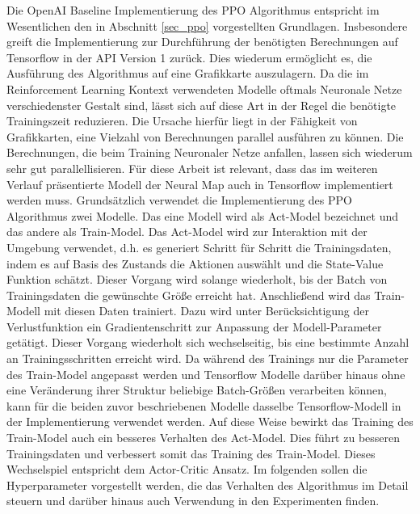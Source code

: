 Die OpenAI Baseline Implementierung des PPO Algorithmus entspricht im Wesentlichen den in Abschnitt \ref{sec_ppo} vorgestellten Grundlagen. Insbesondere greift die Implementierung zur Durchführung der benötigten Berechnungen auf Tensorflow in der API Version 1 zurück. Dies wiederum ermöglicht es, die Ausführung des Algorithmus auf eine Grafikkarte auszulagern. Da die im Reinforcement Learning Kontext verwendeten Modelle oftmals Neuronale Netze verschiedenster Gestalt sind, lässt sich auf diese Art in der Regel die benötigte Trainingszeit reduzieren. Die Ursache hierfür liegt in der Fähigkeit von Grafikkarten, eine Vielzahl von Berechnungen parallel ausführen zu können. Die Berechnungen, die beim Training Neuronaler Netze anfallen, lassen sich wiederum sehr gut parallellisieren. Für diese Arbeit ist relevant, dass das im weiteren Verlauf präsentierte Modell der Neural Map auch in Tensorflow implementiert werden muss. Grundsätzlich verwendet die Implementierung des PPO Algorithmus zwei Modelle. Das eine Modell wird als Act-Model bezeichnet und das andere als Train-Model. Das Act-Model wird zur Interaktion mit der Umgebung verwendet, d.h. es generiert Schritt für Schritt die Trainingsdaten, indem es auf Basis des Zustands die Aktionen auswählt und die State-Value Funktion schätzt. Dieser Vorgang wird solange wiederholt, bis der Batch von Trainingsdaten die gewünschte Größe erreicht hat. Anschließend wird das Train-Modell mit diesen Daten trainiert. Dazu wird unter Berücksichtigung der Verlustfunktion ein Gradientenschritt zur Anpassung der Modell-Parameter getätigt. Dieser Vorgang wiederholt sich wechselseitig, bis eine bestimmte Anzahl an Trainingsschritten erreicht wird. Da während des Trainings nur die Parameter des Train-Model angepasst werden und Tensorflow Modelle darüber hinaus ohne eine Veränderung ihrer Struktur beliebige Batch-Größen verarbeiten können, kann für die beiden zuvor beschriebenen Modelle dasselbe Tensorflow-Modell in der Implementierung verwendet werden. Auf diese Weise bewirkt das Training des Train-Model auch ein besseres Verhalten des Act-Model. Dies führt zu besseren Trainingsdaten und verbessert somit das Training des Train-Model. Dieses Wechselspiel entspricht dem Actor-Critic Ansatz. Im folgenden sollen die Hyperparameter vorgestellt werden, die das Verhalten des Algorithmus im Detail steuern und darüber hinaus auch Verwendung in den Experimenten finden.

